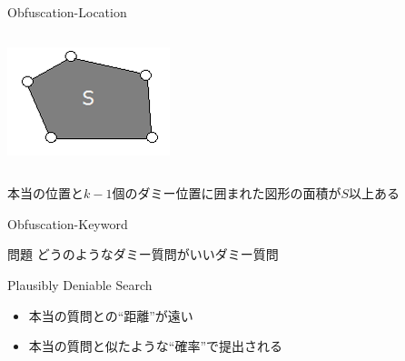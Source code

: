 \documentclass[14pt,xcolor=dvipsnames,table,dvipdfmx]{beamer}
\begin{document}
\begin{frame}{Obfuscation-Location}
    \begin{columns}[c]
        \begin{column}{0.4\textwidth} %
            \includegraphics[width=\columnwidth]{photo10.png}
		\end{column}
    \end{columns}
	\begin{Definition}
		本当の位置と$k-1$個のダミー位置に囲まれた図形の面積が$S$以上ある
	\end{Definition}
\end{frame}

\begin{frame}{Obfuscation-Keyword \cite{balsa_ob-pws:_2012}}
	\begin{block}{問題}
		どうのようなダミー質問がいいダミー質問 \pause
	\end{block}
	\begin{block}{Plausibly Deniable Search \cite{murugesan_providing_2009}}
		\begin{itemize}
			\item 本当の質問との“距離”が遠い
			\item 本当の質問と似たような“確率”で提出される
		\end{itemize}
	\end{block}
\end{frame}
\end{document}
